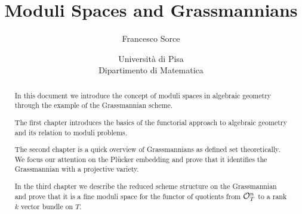 \documentclass[a4paper]{report}
\title{Moduli Spaces and Grassmannians}
\author{Francesco Sorce}
\date{Università di Pisa\\
Dipartimento di Matematica}
\begin{document}
\maketitle

\begin{abstract}
In this document we introduce the concept of moduli spaces in algebraic geometry through the example of the Grassmannian scheme.

The first chapter introduces the basics of the functorial approach to algebraic geometry and its relation to moduli problems.

The second chapter is a quick overview of Grassmannians as defined set theoretically. We focus our attention on the Pl\"ucker embedding and prove that it identifies the Grassmannian with a projective variety.

In the third chapter we describe the reduced scheme structure on the Grassmannian and prove that it is a fine moduli space for the functor of quotients from $\mathcal{O}_T^n$ to a rank $k$ vector bundle on $T$.

\end{abstract}

\tableofcontents
\newpage









%
\end{document}
